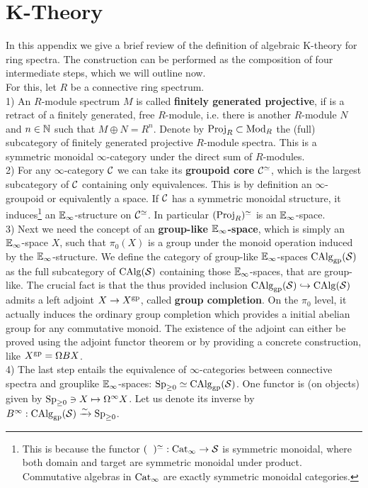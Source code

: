 \appendix
\chapter{K-Theory}
In this appendix we give a brief review of the definition of algebraic K-theory for ring spectra. The construction can be performed as the composition of four intermediate steps, which we will outline now. \\
For this, let $R$ be a connective ring spectrum. \\
1) An $R$-module spectrum $M$ is called \textbf{finitely generated projective}, if is a retract of a finitely generated, free $R$-module, i.e. there is another $R$-module $N$ and  $n\in\mathbb{N}$ such that $M\oplus N=R^n$.
Denote by $\operatorname{Proj}_R\subset \operatorname{Mod}_R$ the (full) subcategory of finitely generated projective $R$-module spectra. This is a symmetric monoidal $\infty$-category under the direct sum of $R$-modules. \\
2) For any $\infty$-category $\mathcal{C}$ we can take its \textbf{groupoid core} $\mathcal{C}^{\simeq}$, which is the largest subcategory of $\mathcal{C}$ containing only equivalences. 
This is by definition an $\infty$-groupoid or equivalently a space. 
If $\mathcal{C}$ has a symmetric monoidal structure, it induces\footnote{This is because the functor $(\phantom{\cC})^{\simeq}:\Cat_{\infty}\ra \Spc$ is symmetric monoidal, where both domain and target are symmetric monoidal under product. 
Commutative algebras in $\operatorname{Cat}_\infty$ are exactly symmetric monoidal categories.} an $\mathbb{E}_\infty$-structure on $\mathcal{C}^{\simeq}$. 
In particular $(\operatorname{Proj}_R)^{\simeq}$ is an $\mathbb{E}_\infty$-space.\\
3) Next we need the concept of an \textbf{group-like $\mathbb{E}_\infty$-space}, which is simply an $\mathbb{E}_\infty$-space $X$, such that $\pi_0(X)$ is a group under the monoid operation induced by the $\mathbb{E}_\infty$-structure.
We define the category of group-like $\mathbb{E}_\infty$-spaces $\operatorname{CAlg}_{\operatorname{gp}}(\mathcal{S})$ as the full subcategory of $\operatorname{CAlg}(\mathcal{S})$ containing those  $\mathbb{E}_\infty$-spaces, that are group-like.
The crucial fact is that the thus provided inclusion $\operatorname{CAlg}_{\operatorname{gp}}(\mathcal{S})\hookrightarrow \operatorname{CAlg}(\mathcal{S})$ admits a left adjoint $X\to X^{\operatorname{gp}}$, called \textbf{group completion}. On the $\pi_0$ level, it actually induces the ordinary group completion which provides a initial abelian group for any commutative monoid. The existence of the adjoint can either be proved using the adjoint functor theorem or by providing a concrete construction, like $X^{\operatorname{gp}}=\Omega BX$. \\
4) The last step entails the equivalence of $\infty$-categories between connective spectra and grouplike $\mathbb{E}_\infty$-spaces: $\operatorname{Sp}_{\geq 0}\simeq \operatorname{CAlg}_{\operatorname{gp}}(\mathcal{S})$. One functor is (on objects) given by $\operatorname{Sp}_{\geq 0}\ni X\mapsto \Omega^{\infty}X$. Let us denote its inverse by $B^\infty:\operatorname{CAlg}_{\operatorname{gp}}(\mathcal{S})\xrightarrow{\sim} \operatorname{Sp}_{\geq 0} $.  \\
